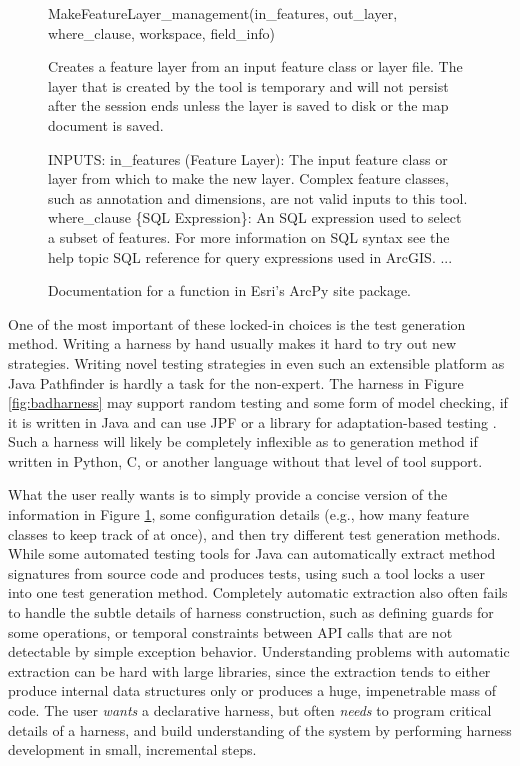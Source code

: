 \begin{figure}[t]
{\scriptsize
\begin{code}
MakeFeatureLayer\_management(in\_features, out\_layer, {where\_clause}, {workspace}, {field\_info})
   
   Creates a feature layer from an input feature class or layer file. The layer
   that is created by the tool is temporary and will not persist after the session
   ends unless the layer is saved to disk or the map document is saved.
    
INPUTS:
 in\_features (Feature Layer):
   The input feature class or layer from which to make the new layer. Complex
   feature classes, such as annotation and dimensions, are not valid inputs to this tool.
 where\_clause \{SQL Expression\}:
   An SQL expression used to select a subset of features. For more information on
   SQL syntax see the help topic SQL reference for query expressions used in ArcGIS.
...
\end{code}
}
\caption{Documentation for a function in Esri's ArcPy site package.}
\label{fig:MakeFeatureLayer}
\end{figure}

One of the most important of these locked-in choices is the  test generation
method.  Writing a harness by hand usually makes it hard to try out
new strategies.   Writing novel testing strategies in even such
an extensible platform as Java Pathfinder is hardly a task for the
non-expert.
The harness in Figure \ref{fig:badharness} may support random testing and
some form of model checking, if it is written in Java and can use JPF
or a library for adaptation-based testing \cite{ISSRE12}. Such a
harness will likely be completely inflexible as to generation method if written in Python, C,
or another language without that level of tool support.

What the user really wants is to simply provide a concise version of the information in
Figure \ref{fig:MakeFeatureLayer}, some configuration details (e.g., how many
feature classes to keep track of at once), and then try different test
generation methods.  While some automated testing tools for Java \cite{FA11,Pacheco}
can automatically extract
method signatures from source code and produces tests,  
using such a tool locks a user into one test generation method.
Completely automatic extraction also often fails to handle
the subtle details of harness construction, such as defining guards
for some operations, or temporal constraints between API calls that
are not detectable by simple exception behavior.  Understanding
problems with automatic extraction can be hard with large libraries,
since the extraction tends to either produce internal data structures
only or produces a huge, impenetrable mass of code. The user \emph{wants} a
declarative harness, but often \emph{needs} to program critical details of a
harness, and build understanding of the system by performing harness development in
small, incremental steps.

